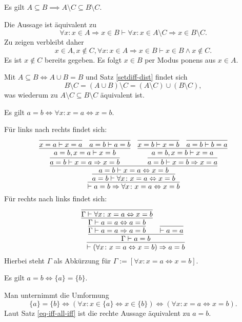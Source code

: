 \begin{Satz}\label{subseteq-diff}
Es gilt $A\subseteq B\implies A\setminus C\subseteq B\setminus C$.
\end{Satz}
\begin{Beweis}[Beweis 1]
Die Aussage ist äquivalent zu
\[\forall x\colon x\in A\Rightarrow x\in B\vdash \forall x\colon x\in A\setminus C\Rightarrow x\in B\setminus C.\]
Zu zeigen verbleibt daher
\[x\in A, x\notin C, \forall x\colon x\in A\Rightarrow x\in B\vdash x\in B\land x\notin C.\]
Es ist $x\notin C$ bereits gegeben. Es folgt $x\in B$ per Modus ponens aus $x\in A$.\,\qedsymbol
\end{Beweis}
\begin{Beweis}[Beweis 2]
Mit $A\subseteq B\Leftrightarrow A\cup B=B$ und Satz \ref{setdiff-dist} findet sich
\[B\setminus C = (A\cup B)\setminus C = (A\setminus C)\cup (B\setminus C),\]
was wiederum zu $A\setminus C\subseteq B\setminus C$ äquivalent ist.\,\qedsymbol
\end{Beweis}

\begin{Satz}\label{eq-iff-all-iff}
Es gilt $a=b\iff \forall x\colon x=a\Leftrightarrow x=b$.
\end{Satz}

\begin{Beweis}
Für links nach rechts findet sich:
\[
\infer{\vdash a=b\Rightarrow\forall x\colon x=a\Leftrightarrow x=b}{
  \infer{a=b\vdash\forall x\colon x=a\Leftrightarrow x=b}{
    \infer{a=b\vdash x=a\Leftrightarrow x=b}{
      \infer{a=b\vdash x=a\Rightarrow x=b}{
        \infer{a=b,x=a\vdash x=b}{
          \infer{x=a\vdash x=a}{} & \infer{a=b\vdash a=b}{}}}
    & \infer{a=b\vdash x=b\Rightarrow x=a}{
        \infer{a=b,x=b\vdash x=a}{
          \infer{x=b\vdash x=b}{} & \infer{a=b\vdash b=a}{}}}}}}
\]
Für rechts nach links findet sich:
\[
\infer{\vdash(\forall x\colon x=a\Leftrightarrow x=b)\Rightarrow a=b}{
  \infer{\Gamma\vdash a=b}{
    \infer{\Gamma\vdash a=a\Rightarrow a=b}{
      \infer{\Gamma\vdash a=a\Leftrightarrow a=b}{
        \infer{\Gamma\vdash\forall x\colon x=a\Leftrightarrow x=b}{}}}
  & \infer{\vdash a=a}{}}}
\]
Hierbei steht $\Gamma$ als Abkürzung für
$\Gamma:=[\forall x\colon x=a\Leftrightarrow x=b]$.\,\qedsymbol
\end{Beweis}

\begin{Satz}
Es gilt $a=b\iff\{a\}=\{b\}$.
\end{Satz}

\begin{Beweis}
Man unternimmt die Umformung
\[\{a\}=\{b\}\iff (\forall x\colon x\in\{a\}\Leftrightarrow x\in\{b\})
\iff (\forall x\colon x=a\Leftrightarrow x=b).\]
Laut Satz \ref{eq-iff-all-iff} ist die rechte Aussage
äquivalent zu $a=b$.\;\qedsymbol
\end{Beweis}

